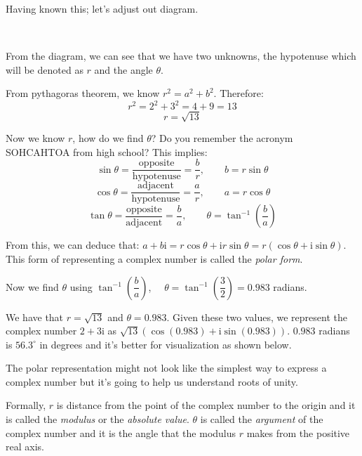 \documentclass[11pt]{article}
\begin{document}
Having known this; let's adjust out diagram.

    \begin{center}
    \end{center}
    { \hspace*{\fill} \\}
    
    From the diagram, we can see that we have two unknowns, the hypotenuse
which will be denoted as \(r\) and the angle \(\theta\).

From pythagoras theorem, we know \(r^2 = a^2 + b^2\).
Therefore:\[r^2 = 2^2 + 3^2 = 4 + 9 = 13\] \[r = \sqrt{13}\]

Now we know \(r\), how do we find \(\theta\)? Do you remember the
acronym SOHCAHTOA from high school? This implies:
\[\sin\theta = \dfrac{\mathrm{opposite}}{\mathrm{hypotenuse}} = \dfrac{b}{r},\qquad b = r\sin\theta\]
\[\cos\theta = \dfrac{\mathrm{adjacent}}{\mathrm{hypotenuse}} = \dfrac{a}{r},\qquad a = r\cos\theta\]
\[\tan\theta = \dfrac{\mathrm{opposite}}{\mathrm{adjacent}} = \dfrac{b}{a}, \qquad \theta = \tan^{-1}(\dfrac{b}{a})\]

From this, we can deduce that:
\(a + b\mathrm{i} = r\cos\theta + \mathrm{i}r\sin\theta = r(\cos\theta + \mathrm{i}\sin\theta)\).
This form of representing a complex number is called the \emph{polar
form}.

Now we find \(\theta\) using \(\tan^{-1}(\dfrac{b}{a})\),
\(\quad \theta = \tan^{-1}(\dfrac{3}{2}) = 0.983\) radians.

We have that \(r = \sqrt{13}\) and \(\theta = 0.983\). Given these two
values, we represent the complex number \(2 + 3\mathrm{i}\) as
\(\sqrt{13}(\cos(0.983) + \mathrm{i}\sin(0.983))\). \(0.983\) radians is
\(56.3^\circ\) in degrees and it's better for visualization as shown
below.

The polar representation might not look like the simplest way to express
a complex number but it's going to help us understand roots of unity.

Formally, \(r\) is distance from the point of the complex number to the
origin and it is called the \emph{modulus} or the \emph{absolute value}.
\(\theta\) is called the \emph{argument} of the complex number and it is
the angle that the modulus \(r\) makes from the positive real axis.

    \begin{center}
    \end{center}
    { \hspace*{\fill} \\}
    
\end{document}
